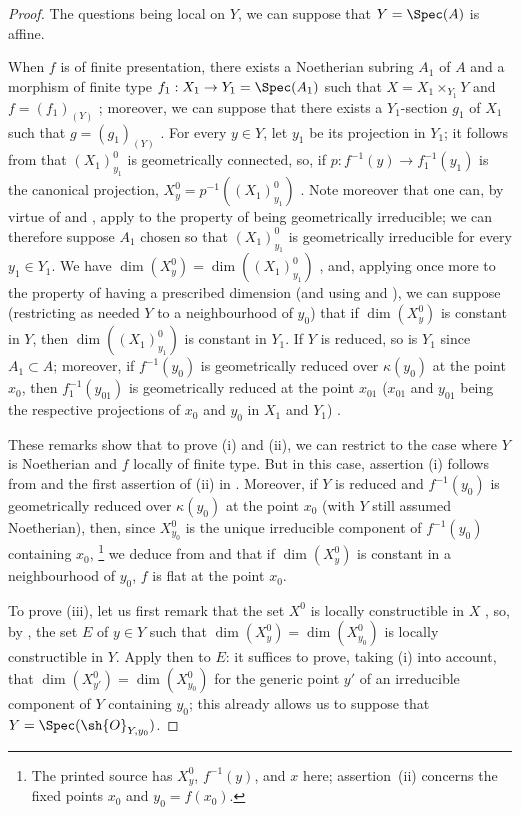 \begin{proof}
The questions being local on $Y$, we can suppose that $Y=\Spec(A)$ is affine.

When $f$ is of finite presentation, there exists a Noetherian subring $A_1$ of $A$ and a morphism of finite type $f_1:X_1\to Y_1=\Spec(A_1)$ such that $X=X_1\times_{Y_1}Y$ and $f=(f_1)_{(Y)}$ ; moreover, we can suppose that there exists a $Y_1$-section $g_1$ of $X_1$ such that $g=(g_1)_{(Y)}$ .
For every $y\in Y$, let $y_1$ be its projection in $Y_1$; it follows from  that $(X_1)_{y_1}^0$ is geometrically connected, so, if $p:f^{-1}(y)\to f_1^{-1}(y_1)$ is the canonical projection, $X_y^0=p^{-1}((X_1)_{y_1}^0)$ .
Note moreover that one can, by virtue of  and , apply  to the property of being geometrically irreducible; we can therefore suppose $A_1$ chosen so that $(X_1)_{y_1}^0$ is geometrically irreducible for every $y_1\in Y_1$.
We have $\dim(X_y^0)=\dim((X_1)_{y_1}^0)$ , and, applying  once more to the property of having a prescribed dimension (and using  and ), we can suppose (restricting as needed $Y$ to a neighbourhood of $y_0$) that if $\dim(X_y^0)$ is constant in $Y$, then $\dim((X_1)_{y_1}^0)$ is constant in $Y_1$.
If $Y$ is reduced, so is $Y_1$ since $A_1\subset A$; moreover, if $f^{-1}(y_0)$ is geometrically reduced over $\kappa(y_0)$ at the point $x_0$, then $f_1^{-1}(y_{01})$ is geometrically reduced at the point $x_{01}$ ($x_{01}$ and $y_{01}$ being the respective projections of $x_0$ and $y_0$ in $X_1$ and $Y_1$) .

These remarks show that to prove (i) and (ii), we can restrict to the case where $Y$ is Noetherian and $f$ locally of finite type.
But in this case, assertion (i) follows from  and the first assertion of (ii) in .
Moreover, if $Y$ is reduced and $f^{-1}(y_0)$ is geometrically reduced over $\kappa(y_0)$ at the point $x_0$ (with $Y$ still assumed
Noetherian), then, since $X_{y_0}^0$ is the unique irreducible component of $f^{-1}(y_0)$ containing $x_0$,
\footnote{The printed source has $X_y^0$, $f^{-1}(y)$, and $x$ here; assertion~(ii) concerns the fixed points $x_0$ and $y_0=f(x_0)$.}
we deduce from  and  that if $\dim(X_y^0)$ is constant in a neighbourhood of $y_0$, $f$ is flat at the point $x_0$.

To prove (iii), let us first remark that the set $X^0$ is locally constructible in $X$ , so, by , the set $E$ of $y\in Y$ such that $\dim(X_y^0)=\dim(X_{y_0}^0)$ is locally constructible in $Y$.
Apply then  to $E$: it suffices to prove, taking (i) into account, that $\dim(X_{y'}^0)=\dim(X_{y_0}^0)$ for the generic point $y'$ of an irreducible component of $Y$ containing $y_0$; this already allows us to suppose that $Y=\Spec(\sh{O}_{Y,y_0})$.


\end{proof}
